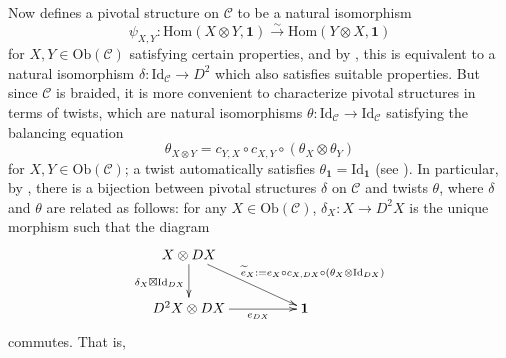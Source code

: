 \documentclass[11pt, reqno]{amsart}
\theoremstyle{definition}\newtheorem{defi}[thm]{Definition}
\theoremstyle{definition}\newtheorem{rem}[thm]{Remark}
\theoremstyle{definition}\newtheorem{exam}[thm]{Example}
\theoremstyle{definition}\newtheorem{assum}[thm]{Assumption}
\newcommand{\cC}{\mathcal{C}}
\newcommand{\til}{\widetilde}
\newcommand{\Id}{\mathrm{Id}}
\newcommand{\vac}{\mathbf{1}}
\begin{document}
Now \cite[Definition 5.1]{BD} defines a pivotal structure on $\cC$ to be a natural isomorphism
\begin{equation*}
\psi_{X,Y}: \mathrm{Hom}(X\otimes Y,\vac)\xrightarrow{\sim}\mathrm{Hom}(Y\otimes X, \vac)
\end{equation*}
for $X,Y\in\mathrm{Ob}(\cC)$ satisfying certain properties, and by \cite[Proposition 5.7]{BD}, this is equivalent to a natural isomorphism $\delta: \Id_\cC\rightarrow D^2$ which also satisfies suitable properties.
 But since $\cC$ is braided, it is more convenient to characterize pivotal structures in terms of twists, which are natural isomorphisms $\theta:\Id_\cC\rightarrow\Id_\cC$ satisfying the balancing equation
\begin{equation}\label{eqn:balancing}
\theta_{X\otimes Y}= c_{Y,X}\circ c_{X,Y}\circ(\theta_X\otimes\theta_Y)
\end{equation}
for $X,Y\in\mathrm{Ob}(\cC)$; a twist automatically satisfies $\theta_\vac=\Id_\vac$ (see \cite[Remark 6.6(i) and (ii)]{BD}). In particular, by \cite[Proposition 7.1]{BD}, there is a bijection between pivotal structures $\delta$ on $\cC$ and twists $\theta$, where $\delta$ and $\theta$ are related as follows: for any $X\in\mathrm{Ob}(\cC)$, $\delta_X: X\rightarrow D^2X$ is the unique morphism such that the diagram
\begin{equation}\label{diag:delta_def}
  \xymatrixcolsep{4pc}
  \begin{matrix}
  \xymatrix{
  X\otimes DX \ar[d]_{\delta_X\boxtimes\Id_{DX}} \ar[rd]^{\quad\qquad\til{e}_X:=e_X\circ c_{X,DX}\circ(\theta_X\otimes\Id_{DX})} &  \\
D^2X \otimes DX \ar[r]_(.6){e_{DX}} & \vac \\
  }
  \end{matrix}
 \end{equation}
 commutes. That is,
\end{document}

